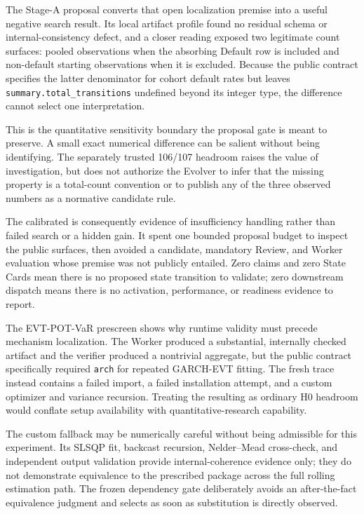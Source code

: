 The Stage-A proposal converts that open localization premise into a useful
negative search result. Its local artifact profile found no residual schema or
internal-consistency defect, and a closer reading exposed two legitimate count
surfaces: \CreditMigrationHZeroSummaryMass{} pooled observations when the
absorbing Default row is included and \CreditMigrationHZeroCohortMass{}
non-default starting observations when it is excluded. Because the public
contract specifies the latter denominator for cohort default rates but leaves
\texttt{summary.total\_transitions} undefined beyond its integer type, the
\CreditMigrationHZeroMassGap{} difference cannot select one interpretation.

This is the quantitative sensitivity boundary the proposal gate is meant to
preserve. A small exact numerical difference can be salient without being
identifying. The separately trusted 106/107 headroom raises the value of
investigation, but does not authorize the Evolver to infer that the missing
property is a total-count convention or to publish any of the three observed
numbers as a normative candidate rule.

The calibrated \CreditMigrationProposalDecision{} is consequently evidence of
insufficiency handling rather than failed search or a hidden gain. It spent one
bounded proposal budget to inspect the public surfaces, then avoided a
candidate, mandatory Review, and Worker evaluation whose premise was not
publicly entailed. Zero claims and zero State Cards mean there is no proposed
state transition to validate; zero downstream dispatch means there is no
activation, performance, or readiness evidence to report.

The EVT-POT-VaR prescreen shows why runtime validity must precede mechanism
localization. The Worker produced a substantial, internally checked artifact
and the verifier produced a nontrivial aggregate, but the public contract
specifically required \texttt{arch} for repeated GARCH-EVT fitting. The fresh
trace instead contains a failed import, a failed installation attempt, and a
custom optimizer and variance recursion. Treating the resulting
\EvtPotHZeroOfficial{} as ordinary H0 headroom would conflate setup
availability with quantitative-research capability.

The custom fallback may be numerically careful without being admissible for
this experiment. Its SLSQP fit, backcast recursion, Nelder--Mead cross-check,
and independent output validation provide internal-coherence evidence only;
they do not demonstrate equivalence to the prescribed package across the full
rolling estimation path. The frozen dependency gate deliberately avoids an
after-the-fact equivalence judgment and selects \EvtPotHZeroDecision{} as soon
as substitution is directly observed.

